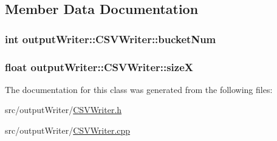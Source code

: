 \subsection{Member Data Documentation}
\subsubsection[{\texorpdfstring{bucket\+Num}{bucketNum}}]{\setlength{\rightskip}{0pt plus 5cm}int output\+Writer\+::\+C\+S\+V\+Writer\+::bucket\+Num\hspace{0.3cm}{\ttfamily [private]}}\hypertarget{classoutputWriter_1_1CSVWriter_aff7fb0f68a0a6823118997606ed688a2}{}\label{classoutputWriter_1_1CSVWriter_aff7fb0f68a0a6823118997606ed688a2}
\subsubsection[{\texorpdfstring{sizeX}{sizeX}}]{\setlength{\rightskip}{0pt plus 5cm}float output\+Writer\+::\+C\+S\+V\+Writer\+::sizeX\hspace{0.3cm}{\ttfamily [private]}}\hypertarget{classoutputWriter_1_1CSVWriter_ab72029e6c3e7fe219e71f41fe876501c}{}\label{classoutputWriter_1_1CSVWriter_ab72029e6c3e7fe219e71f41fe876501c}


The documentation for this class was generated from the following files\+:\begin{DoxyCompactItemize}
\item 
src/output\+Writer/\hyperlink{CSVWriter_8h}{C\+S\+V\+Writer.\+h}\item 
src/output\+Writer/\hyperlink{CSVWriter_8cpp}{C\+S\+V\+Writer.\+cpp}\end{DoxyCompactItemize}
